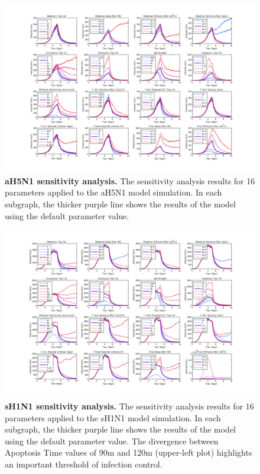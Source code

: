 \documentclass[10pt]{article}
\begin{document}
\pagebreak
\begin{landscape}

\begin{figure}[ht!]
\begin{center}
	\includegraphics[width=9in]{Figure_S3}
	\caption{\textbf{aH5N1 sensitivity analysis.} The sensitivity analysis results for 16 parameters applied to the aH5N1 model simulation.  In each subgraph, the thicker purple line shows the results of the model using the default parameter value.}
	\label{fig:asensitivity}
\end{center}
\end{figure}

\begin{figure}[ht!]
\begin{center}
	\includegraphics[width=9in]{Figure_S4}
	\caption{\textbf{sH1N1 sensitivity analysis.} The sensitivity analysis results for 16 parameters applied to the sH1N1 model simulation.  In each subgraph, the thicker purple line shows the results of the model using the default parameter value.  The divergence between Apoptosis Time values of 90m and 120m (upper-left plot) highlights an important threshold of infection control.}
	\label{fig:ssensitivity}
\end{center}
\end{figure}


\end{landscape}
\end{document}
